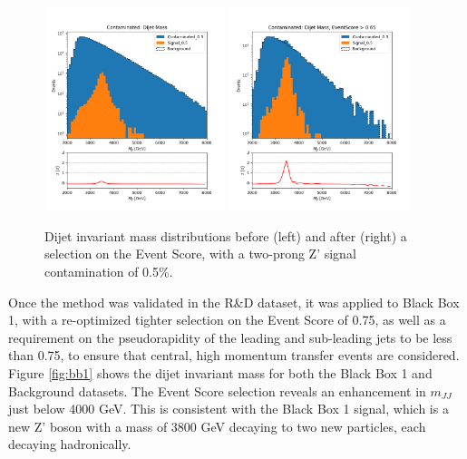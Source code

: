 \documentclass[letterpaper,11pt]{article}
\begin{document}
\begin{figure}[h!]
	\begin{center}
		\includegraphics[width=0.47\textwidth]{imgs/2Prong_Contaminated_0p5_JJ_Mass_Multi.png}
		\includegraphics[width=0.47\textwidth]{imgs/2Prong_Contaminated_0p5_JJ_Mass_EventScore0p65_Multi.png}
	\end{center}
	\caption{Dijet invariant mass distributions before (left) and after (right) a selection on the Event Score, with a two-prong Z' signal contamination of 0.5\%.}
	\label{fig:m_JJ}
\end{figure}

Once the method was validated in the R\&D dataset, it was applied to Black Box 1, with a re-optimized tighter selection on the Event Score of 0.75, as well as a requirement on the pseudorapidity of the leading and sub-leading jets to be less than 0.75, to ensure that central, high momentum transfer events are considered. Figure {\ref{fig:bb1}} shows the dijet invariant mass for both the Black Box 1 and Background datasets. The Event Score selection reveals an enhancement in $m_{JJ}$ just below 4000 GeV. This is consistent with the Black Box 1 signal, which is a new Z' boson with a mass of 3800 GeV decaying to two new particles, each decaying hadronically.
\end{document}
